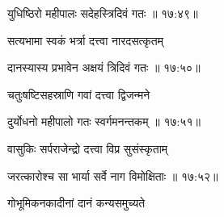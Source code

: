 
{\devanagarifont युधिष्ठिरो महीपालः सदेहस्त्रिदिवं गतः {॥ १७:४९॥} \veg\dontdisplaylinenum }%

{\devanagarifont सत्यभामा स्वकं भर्त्रा दत्त्वा नारदसत्कृतम् \thinspace{\dandab} \dontdisplaylinenum }%


{\devanagarifont दानस्यास्य प्रभावेन अक्षयं त्रिदिवं गतः {॥ १७:५०॥} \veg\dontdisplaylinenum }%

{\devanagarifont चतुःषष्टिसहस्राणि गवां दत्त्वा द्विजन्मने \thinspace{\dandab} \dontdisplaylinenum }%
  

{\devanagarifont दुर्योधनो महीपालो गतः स्वर्गमनन्तकम् {॥ १७:५१॥} \veg\dontdisplaylinenum }%

{\devanagarifont वासुकिः सर्पराजेन्द्रो दत्त्वा विप्र सुसंस्कृताम् \thinspace{\dandab} \dontdisplaylinenum }%


{\devanagarifont जरत्कारोश्च सा भार्या सर्वे नाग विमोक्षिताः {॥ १७:५२॥} \veg\dontdisplaylinenum }%


{\devanagarifont गोभूमिकनकादीनां दानं कन्यसमुच्यते \thinspace{\dandab} \dontdisplaylinenum }%

